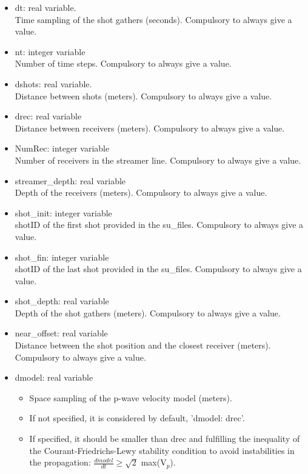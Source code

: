 \documentclass[11pt, oneside]{article}   	%
\begin{document}
\begin{itemize}
\item dt: real variable. \\
Time sampling of the shot gathers (seconds). Compulsory to always give a value.
\item nt: integer variable  \\
Number of time steps. Compulsory to always give a value.
\item dshots: real variable. \\
Distance between shots (meters). Compulsory to always give a value.
\item drec: real variable  \\
Distance between receivers (meters). Compulsory to always give a value.
\item NumRec: integer variable  \\
Number of receivers in the streamer line. Compulsory to always give a value.
\item streamer\_depth: real variable  \\ 
Depth of the receivers (meters). Compulsory to always give a value.
\item shot\_init: integer variable  \\
shotID of the first shot provided in the su\_files. Compulsory to always give a value.
\item shot\_fin: integer variable \\
shotID of the last shot provided in the su\_files. Compulsory to always give a value.
\item shot\_depth: real variable  \\
Depth of the shot gathers (meters). Compulsory to always give a value.
\item near\_offset: real variable  \\
Distance between the shot position and the closest receiver (meters). Compulsory to always give a value.

\item dmodel: real variable
\begin{itemize}
	\item Space sampling of the p-wave velocity model (meters). 
	\item If not specified, it is considered by default, 'dmodel: drec'.
	\item If specified, it should be smaller than drec and fulfilling the inequality of the Courant-Friedrichs-Lewy stability condition to avoid instabilities in the propagation: $\frac{dmodel}{dt} \ge  \sqrt{2}$ max(V$_p$).
	\end{itemize}


\end{itemize}
\end{document}
